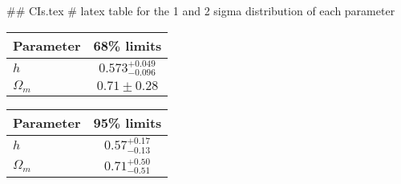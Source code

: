 ## CIs.tex
# latex table for the 1 and 2 sigma distribution of each parameter

\begin{tabular} { l  c}
 Parameter &  68\% limits\\
\hline
{\boldmath$h              $} & $0.573^{+0.049}_{-0.096}   $\\
{\boldmath$\Omega_m       $} & $0.71\pm 0.28              $\\
\hline
\end{tabular}

\begin{tabular} { l  c}
 Parameter &  95\% limits\\
\hline
{\boldmath$h              $} & $0.57^{+0.17}_{-0.13}      $\\
{\boldmath$\Omega_m       $} & $0.71^{+0.50}_{-0.51}      $\\
\hline
\end{tabular}
